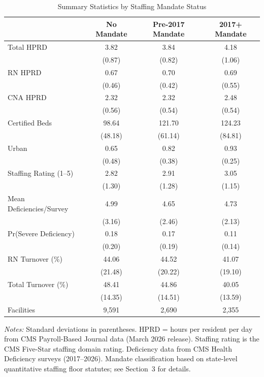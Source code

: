 \begin{table}[htbp]
\centering
\caption{Summary Statistics by Staffing Mandate Status}
\label{tab:summary}
\begin{tabular}{lccc}
\hline\hline
 & No Mandate & Pre-2017 Mandate & 2017+ Mandate \\
\hline
Total HPRD & 3.82 & 3.84 & 4.18 \\
 & (0.87) & (0.82) & (1.06) \\
RN HPRD & 0.67 & 0.70 & 0.69 \\
 & (0.46) & (0.42) & (0.55) \\
CNA HPRD & 2.32 & 2.32 & 2.48 \\
 & (0.56) & (0.54) & (0.54) \\
Certified Beds & 98.64 & 121.70 & 124.23 \\
 & (48.18) & (61.14) & (84.81) \\
Urban & 0.65 & 0.82 & 0.93 \\
 & (0.48) & (0.38) & (0.25) \\
Staffing Rating (1--5) & 2.82 & 2.91 & 3.05 \\
 & (1.30) & (1.28) & (1.15) \\
Mean Deficiencies/Survey & 4.99 & 4.65 & 4.73 \\
 & (3.16) & (2.46) & (2.13) \\
Pr(Severe Deficiency) & 0.18 & 0.17 & 0.11 \\
 & (0.20) & (0.19) & (0.14) \\
RN Turnover (\%) & 44.06 & 44.52 & 41.07 \\
 & (21.48) & (20.22) & (19.10) \\
Total Turnover (\%) & 48.41 & 44.86 & 40.05 \\
 & (14.35) & (14.51) & (13.59) \\
\hline
Facilities & 9,591 & 2,690 & 2,355 \\
\hline\hline
\end{tabular}
\begin{tablenotes}[flushleft]
\small
\item \textit{Notes:} Standard deviations in parentheses. HPRD = hours per resident per day from CMS Payroll-Based Journal data (March 2026 release). Staffing rating is the CMS Five-Star staffing domain rating. Deficiency data from CMS Health Deficiency surveys (2017--2026). Mandate classification based on state-level quantitative staffing floor statutes; see Section~3 for details.
\end{tablenotes}
\end{table}

